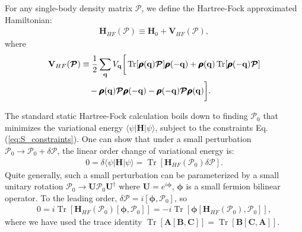 \begin{subappendices}
    For any single-body density matrix $\boldsymbol{\mathcal P}$, we define the Hartree-Fock approximated Hamiltonian:
    \begin{align}
        \mathbf H_{HF}(\boldsymbol{\mathcal P})\equiv \mathbf H_0+\mathbf V_{HF}(\boldsymbol{\mathcal P}),
    \end{align}
    where
    \begin{align}
        \mathbf V_{HF}(\boldsymbol{\mathcal P}) & \equiv \frac{1}{2} \sum_{{\mathbf q}}V_{\mathbf q}\bigg[ \mathop{\mathrm{Tr}}[\pmb{\boldsymbol\rho}(\mathbf q)\boldsymbol{\mathcal P}]\pmb{\boldsymbol\rho}(-\mathbf q)+\pmb{\boldsymbol\rho}(\mathbf q)\mathop{\mathrm{Tr}}[\pmb{\boldsymbol\rho}(-\mathbf q)\boldsymbol{\mathcal P}]\notag \\
                                                & \quad-\pmb{\boldsymbol\rho}(\mathbf q)\boldsymbol{\mathcal P}\pmb{\boldsymbol\rho}(-\mathbf q)-\pmb{\boldsymbol\rho}(-\mathbf q)\boldsymbol{\mathcal P}\pmb{\boldsymbol\rho}(\mathbf q) \bigg].
    \end{align}

    The standard static Hartree-Fock calculation boils down to finding $\boldsymbol{\mathcal P}_0$ that minimizes the variational energy $\langle\psi|\mathbf H|\psi\rangle$, subject to the constraints Eq.(\ref{eq:S_constraints}). One can show that under a small perturbation $\boldsymbol{\mathcal P}_0\rightarrow \boldsymbol{\mathcal P}_0+\delta\boldsymbol{\mathcal P}$, the linear order change of variational energy is:
    \begin{align}
        0=\delta\langle\psi|\mathbf H|\psi\rangle=\mathop{\mathrm{Tr}}[\mathbf H_{HF}(\boldsymbol{\mathcal P}_0)\delta\boldsymbol{\mathcal P}].
    \end{align}
    Quite generally, such a small perturbation can be parameterized by a small unitary rotation $\boldsymbol{\mathcal P}_0\rightarrow \mathbf U\boldsymbol{\mathcal P}_0\mathbf U^\dagger$ where $\mathbf U=e^{i\boldsymbol\phi}$, $\boldsymbol\phi$ is a small fermion bilinear operator. To the leading order, $\delta\boldsymbol{\mathcal P}=i[\boldsymbol\phi,\boldsymbol{\mathcal P}_0]$, so
    \begin{align}
        0=i\mathop{\mathrm{Tr}}[\mathbf H_{HF}(\boldsymbol{\mathcal P}_0)[\boldsymbol\phi,\boldsymbol{\mathcal P}_0]]=-i\mathop{\mathrm{Tr}}[\boldsymbol\phi[\mathbf H_{HF}(\boldsymbol{\mathcal P}_0),\boldsymbol{\mathcal P}_0]],\label{eq:P0_condition}
    \end{align}
    where we have used the trace identity $\mathop{\mathrm{Tr}}[\mathbf A[\mathbf B,\mathbf C]]=\mathop{\mathrm{Tr}}[\mathbf B[\mathbf C,\mathbf A]]$.


\end{subappendices}
